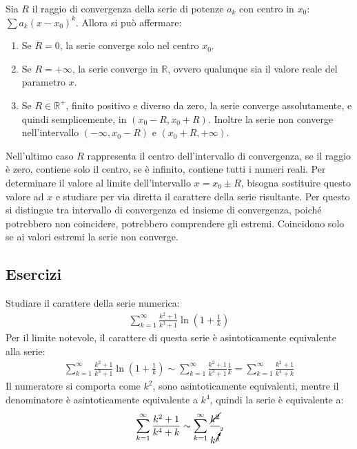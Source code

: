 \documentclass{article}
\numberwithin{equation}{subsection}
\begin{document}
Sia $R$ il raggio di convergenza della serie di potenze $a_k$ con centro in $x_0$: $\sum a_k(x-x_0)^k$. Allora si può affermare:
\begin{enumerate}
    \item Se $R=0$, la serie converge solo nel centro $x_0$. 
    \item Se $R=+\infty$, la serie converge in $\mathbb{R}$, ovvero qualunque sia il valore reale del parametro $x$. 
    \item Se $R\in\mathbb{R}^+$, finito positivo e diverso da zero, la serie converge assolutamente, e quindi semplicemente, in $(x_0-R, x_0+R)$. Inoltre la serie non converge nell'intervallo $(-\infty,x_0-R)$ e $(x_0+R, +\infty)$. 
\end{enumerate}

Nell'ultimo caso $R$ rappresenta il centro dell'intervallo di convergenza, se il raggio è zero, contiene solo il centro, se è infinito, contiene tutti i numeri reali. 
Per determinare il valore al limite dell'intervallo $x=x_0\pm R$, bisogna sostituire questo valore ad $x$ e studiare per via diretta il carattere della serie risultante. Per questo si distingue tra intervallo di convergenza ed insieme di convergenza, poiché potrebbero non coincidere, potrebbero comprendere gli estremi. Coincidono solo se ai valori estremi la serie non converge. 


\subsection*{Esercizi}

Studiare il carattere della serie numerica:
\begin{gather*}
    \displaystyle\sum_{k=1}^\infty\frac{k^2+1}{k^3+1}\ln\left(1+\frac{1}{k}\right)
\end{gather*}
Per il limite notevole, il carattere di questa serie è asintoticamente equivalente alla serie:
\begin{gather*}
    \displaystyle\sum_{k=1}^\infty\frac{k^2+1}{k^3+1}\ln\left(1+\frac{1}{k}\right)\sim
    \displaystyle\sum_{k=1}^\infty\frac{k^2+1}{k^3+1}\frac{1}{k}=
    \displaystyle\sum_{k=1}^\infty\frac{k^2+1}{k^4+k}
\end{gather*}
Il numeratore si comporta come $k^2$, sono asintoticamente equivalenti, mentre il denominatore è asintoticamente equivalente a $k^4$, quindi la serie è equivalente a:
\begin{gather*}
    \displaystyle\sum_{k=1}^\infty\frac{k^2+1}{k^4+k}\sim
    \displaystyle\sum_{k=1}^\infty\frac{\cancel{k^2}}{k^{\cancelto{2}{4}}}
\end{gather*}
\end{document}
